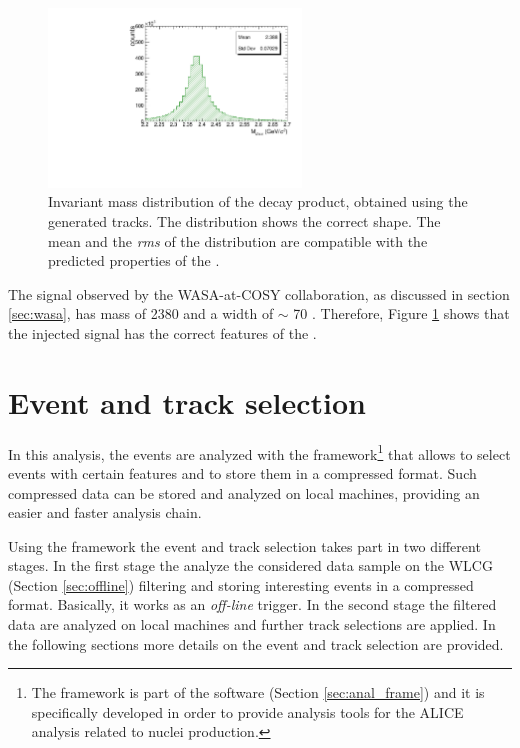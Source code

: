 \begin{figure}
    \centering
    \includegraphics[width=0.6\textwidth]{gfx/valid}
	\caption{Invariant mass distribution of the \dst decay product, obtained using the generated tracks. The distribution shows the correct shape. The mean and the \textit{rms} of the distribution are compatible with the predicted properties of the \dst.}
	\label{fig:valid}
\end{figure}

The signal observed by the WASA-at-COSY collaboration, as discussed in section \ref{sec:wasa}, has
mass of 2380 \mevcs and a width of $\sim$ 70 \mevcs. Therefore, Figure \ref{fig:valid} shows that the
injected signal has the correct features of the \dst.

%
%
\section{Event and track selection} \label{sec:4.2}

In this analysis, the events are analyzed with the  framework\footnote{The  
framework is part of the  software (Section \ref{sec:anal_frame}) and it is 
specifically developed in order to provide analysis tools for the ALICE analysis related to nuclei
production.} that allows to select events with certain features and to store them in a compressed
format.
Such compressed data can be stored and analyzed on local machines, providing an easier and faster 
analysis chain.

Using the  framework the event and track selection takes part in two different stages.
In the first stage the  analyze the considered data sample on the WLCG (Section 
\ref{sec:offline}) filtering and storing interesting events in a compressed format. 
Basically, it works as an \textit{off-line} trigger.
In the second stage the filtered data are analyzed on local machines and further track
selections are applied.
In the following sections more details on the event and track selection are provided.

